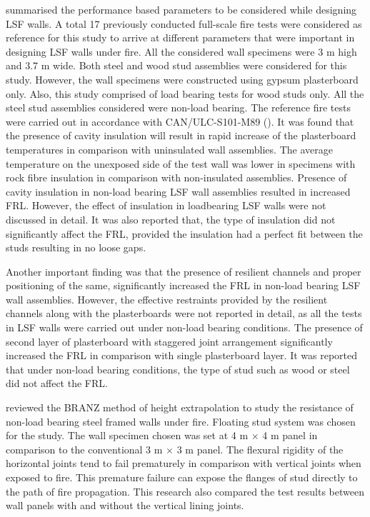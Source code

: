 \citet{Sultan2000a} summarised the performance based parameters to be considered while designing LSF walls. A total 17 previously conducted full-scale fire tests were considered as reference for this study to arrive at different parameters that were important in designing LSF walls under fire. All the considered wall specimens were 3 m high and 3.7 m wide. Both steel and wood stud assemblies were considered for this study. However, the wall specimens were constructed using gypsum plasterboard only. Also, this study comprised of load bearing tests for wood studs only. All the steel stud assemblies considered were non-load bearing. The reference fire tests were carried out in accordance with CAN/ULC-S101-M89 (\citeyear{ULC1989}). It was found that the presence of cavity insulation will result in rapid increase of the plasterboard temperatures in comparison with uninsulated wall assemblies. The average temperature on the unexposed side of the test wall was lower in specimens with rock fibre insulation in comparison with non-insulated assemblies. Presence of cavity insulation in non-load bearing LSF wall assemblies resulted in increased FRL. However, the effect of insulation in loadbearing LSF walls were not discussed in detail. It was also reported that, the type of insulation did not significantly affect the FRL, provided the insulation had a perfect fit between the studs resulting in no loose gaps.

Another important finding was that the presence of resilient channels and proper positioning of the same, significantly increased the FRL in non-load bearing LSF wall assemblies. However, the effective restraints provided by the resilient channels along with the plasterboards were not reported in detail, as all the tests in LSF walls were carried out under non-load bearing conditions. The presence of second layer of plasterboard with staggered joint arrangement significantly increased the FRL in comparison with single plasterboard layer. It was reported that under non-load bearing conditions, the type of stud such as wood or steel did not affect the FRL.  

\citet{Collier2002} reviewed the BRANZ method of height extrapolation to study the resistance of non-load bearing steel framed walls under fire. Floating stud system was chosen for the study. The wall specimen chosen was set at 4 m $\times$ 4 m panel in comparison to the conventional 3 m $\times$ 3 m panel. The flexural rigidity of the horizontal joints tend to fail prematurely in comparison with vertical joints when exposed to fire. This premature failure can expose the flanges of stud directly to the path of fire propagation. This research also compared the test results between wall panels with and without the vertical lining joints.

